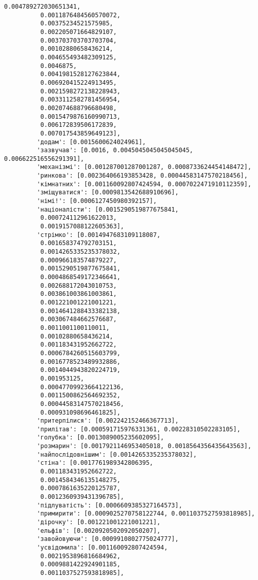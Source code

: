 \documentclass[11pt]{article}
\begin{document}
\begin{Verbatim}[commandchars=\\\{\}]
          0.004789272030651341,
          0.0011876484560570072,
          0.00375234521575985,
          0.002205071664829107,
          0.003703703703703704,
          0.00102880658436214,
          0.004655493482309125,
          0.0046875,
          0.0041981528127623844,
          0.006920415224913495,
          0.0021598272138228943,
          0.0033112582781456954,
          0.002074688796680498,
          0.0015479876160990713,
          0.006172839506172839,
          0.007017543859649123],
         'додам': [0.0015600624024961],
         'зазвучав': [0.0016, 0.0045045045045045045, 0.006622516556291391],
         'механізмі': [0.001287001287001287, 0.0008733624454148472],
         'ринкова': [0.002364066193853428, 0.00044583147570218456],
         'кімнатних': [0.001160092807424594, 0.0007022471910112359],
         'зміщуватися': [0.0009813542688910696],
         'німі!': [0.0006127450980392157],
         'націоналісти': [0.0015290519877675841,
          0.000724112961622013,
          0.0019157088122605363],
         'стрімко': [0.0014947683109118087,
          0.001658374792703151,
          0.0014265335235378032,
          0.000966183574879227,
          0.0015290519877675841,
          0.0004868549172346641,
          0.002688172043010753,
          0.003861003861003861,
          0.001221001221001221,
          0.0014641288433382138,
          0.003067484662576687,
          0.0011001100110011,
          0.00102880658436214,
          0.001183431952662722,
          0.0006784260515603799,
          0.0016778523489932886,
          0.0014044943820224719,
          0.001953125,
          0.00047709923664122136,
          0.0011500862564692352,
          0.00044583147570218456,
          0.000931098696461825],
         'притерпілися': [0.002242152466367713],
         'прилітав': [0.000591715976331361, 0.00228310502283105],
         'голубка': [0.0013089005235602095],
         'розмарин': [0.0017921146953405018, 0.0018564356435643563],
         'найпослідовнішим': [0.0014265335235378032],
         'стіна': [0.0017761989342806395,
          0.001183431952662722,
          0.0014584346135148275,
          0.0007861635220125787,
          0.0012360939431396785],
         'підлуватість': [0.0006609385327164573],
         'примирити': [0.0009025270758122744, 0.0011037527593818985],
         'дірочку': [0.001221001221001221],
         'ельфів': [0.0020920502092050207],
         'завойовуючи': [0.0009910802775024777],
         'усвідомила': [0.001160092807424594,
          0.0021953896816684962,
          0.0009881422924901185,
          0.0011037527593818985],

\end{Verbatim}
\end{document}
